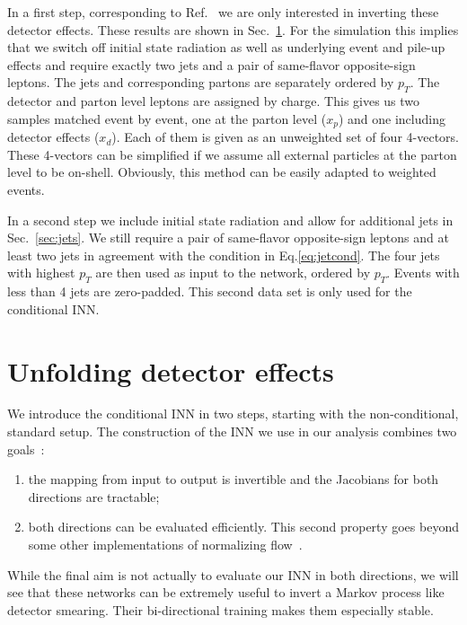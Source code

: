 In a first step, corresponding to Ref.~\cite{fcgan} we are only
interested in inverting these detector effects. These results are
shown in Sec.~\ref{sec:inn}. For the simulation this implies that we
switch off initial state radiation as well as underlying event and
pile-up effects and require exactly two jets and a pair of same-flavor
opposite-sign leptons. The jets and corresponding partons are
separately ordered by $p_T$. The detector and parton level leptons are
assigned by charge. This gives us two samples matched event by event,
one at the parton level ($x_p$) and one including detector effects
($x_d$).  Each of them is given as an unweighted set of four
4-vectors. These 4-vectors can be simplified if we assume all external
particles at the parton level to be on-shell. Obviously, this
method can be easily adapted to weighted events.

In a second step we include initial state radiation and allow for
additional jets in Sec.~\ref{sec:jets}.  We still require a pair of
same-flavor opposite-sign leptons and at least two jets in agreement
with the condition in Eq.\eqref{eq:jetcond}. The four jets with
highest $p_T$ are then used as input to the network, ordered by
$p_T$. Events with less than 4 jets are zero-padded. This second
data set is only used for the conditional INN.

\section{Unfolding detector effects}
\label{sec:inn}

We introduce the conditional INN in two steps, starting with the
non-conditional, standard setup. The construction of the INN we use in
our analysis combines two goals~\cite{inn1}:
%
\begin{enumerate}
\item the mapping from input to output is invertible and the Jacobians
  for both directions are tractable;
\item both directions can be evaluated efficiently. This second
  property goes beyond some other implementations of normalizing
  flow~\cite{nflow1,nflow_review}.
\end{enumerate}
%
While the final aim is not actually to evaluate our INN in both directions, we will
see that these networks can be extremely useful to invert a Markov
process like detector smearing. Their bi-directional training makes
them especially stable.


